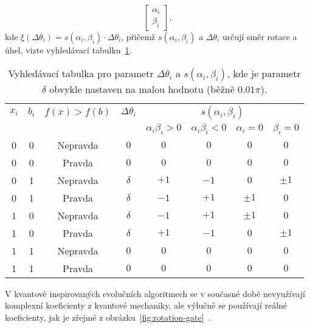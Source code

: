 \begin{enumerate}
\begin{equation}
\begin{bmatrix}
                \alpha_i \\
                \beta_i 
            \end{bmatrix},
        \end{equation}
        kde $\xi \left( \Delta\theta_i \right) = s\left( \alpha_i , \beta_i \right) \cdot \Delta\theta_i $, přičemž $s\left( \alpha_i , \beta_i \right)$ a $\Delta\theta_i$ určují směr rotace a úhel, vizte vyhledávací tabulku~\ref{tab:look-up-table-angle-update}.
        \begin{table}[ht!]
            \centering
            \begin{tabular}{|c|c|c|c|c|c|c|c|}
                \hline
                $x_i$ & $b_i$ & $f\left(x\right) > f\left(b\right)$ & $\Delta \theta_i$ & \multicolumn{4}{c|}{$s\left(\alpha_i, \beta_i\right)$} \\
                \cline{5-8}
                & & & & $\alpha_i \beta_i > 0$& $\alpha_i \beta_i < 0$ & $ \alpha_i = 0$ & $\beta_i = 0$ \\
                \hline
                0 & 0 & Nepravda & $0$      & $0$  & $0$  & $0$     & $0$ \\
                0 & 0 & Pravda   & $0$      & $0$  & $0$  & $0$     & $0$ \\
                0 & 1 & Nepravda & $\delta$ & $+1$ & $-1$ & $0$     & $\pm 1$ \\
                0 & 1 & Pravda   & $\delta$ & $-1$ & $+1$ & $\pm 1$ & $0$ \\
                1 & 0 & Nepravda & $\delta$ & $-1$ & $+1$ & $\pm 1$ & $0$ \\
                1 & 0 & Pravda   & $\delta$ & $+1$ & $-1$ & $0$     & $\pm 1$ \\
                1 & 1 & Nepravda & $0$      & $0$  & $0$  & $0$     & $0$ \\
                1 & 1 & Pravda   & $0$      & $0$  & $0$  & $0$     & $0$ \\
                \hline
            \end{tabular}
            \caption{Vyhledávací tabulka pro parametr $\Delta\theta_i$ a $s\left(\alpha_i, \beta_i\right)$, kde je parametr $\delta$ obvykle nastaven na malou hodnotu (běžně $0.01 \pi$).}
            \label{tab:look-up-table-angle-update}
        \end{table}
\end{enumerate}

V kvantově inspirovaných evolučních algoritmech se v současné době nevyužívají komplexní koeficienty z kvantové mechaniky, ale výlučně se používají reálné koeficienty, jak je zřejmé z obrázku~\ref{fig:rotation-gate}~\cite{NaturalComputing}.

